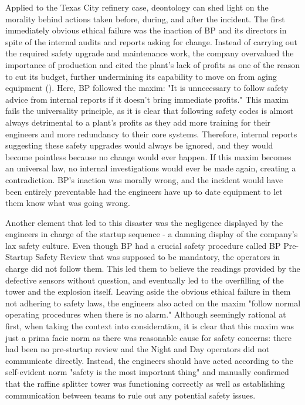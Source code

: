 \documentclass[12pt]{article}
\begin{document}
	Applied to the Texas City refinery case, deontology can shed light on the morality behind actions taken before, during, and after the incident. The first immediately obvious ethical failure was the inaction of BP and its directors in spite of the internal audits and reports asking for change. Instead of carrying out the required safety upgrade and maintenance work, the company overvalued the importance of production and cited the plant's lack of profits as one of the reason to cut its budget, further undermining its capability to move on from aging equipment (\cite{csbreport}). Here, BP followed the maxim: "It is unnecessary to follow safety advice from internal reports if it doesn't bring immediate profits." This maxim fails the universality principle, as it is clear that following safety codes is almost always detrimental to a plant's profits as they add more training for their engineers and more redundancy to their core systems. Therefore, internal reports suggesting these safety upgrades would always be ignored, and they would become pointless because no change would ever happen. If this maxim becomes an universal law, no internal investigations would ever be made again, creating a contradiction. BP's inaction was morally wrong, and the incident would have been entirely preventable had the engineers have up to date equipment to let them know what was going wrong.
	
	Another element that led to this disaster was the negligence displayed by the engineers in charge of the startup sequence - a damning display of the company's lax safety culture. Even though BP had a crucial safety procedure called BP Pre-Startup Safety Review that was supposed to be mandatory, the operators in charge did not follow them. This led them to believe the readings provided by the defective sensors without question, and eventually led to the overfilling of the tower and the explosion itself. Leaving aside the obvious ethical failure in them not adhering to safety laws, the engineers also acted on the maxim "follow normal operating procedures when there is no alarm." Although seemingly rational at first, when taking the context into consideration, it is clear that this maxim was just a prima facie norm as there was reasonable cause for safety concerns: there had been no pre-startup review and the Night and Day operators did not communicate directly. Instead, the engineers should have acted according to the self-evident norm "safety is the most important thing" and manually confirmed that the raffine splitter tower was functioning correctly as well as establishing communication between teams to rule out any potential safety issues.
		
\end{document}
